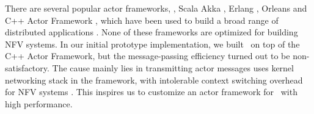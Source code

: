 There are several popular actor frameworks, \eg, Scala Akka \cite{akka}, Erlang \cite{erlang}, Orleans \cite{Orleans} and C++ Actor Framework \cite{caf}, which have been used to build a broad range of distributed applications \cite{akka}. %
 None of these frameworks are optimized for building NFV systems. In our initial prototype implementation, we built \nfactor~on top of the C++ Actor Framework, but the message-passing efficiency turned out to be non-satisfactory. The cause mainly lies in transmitting actor messages uses kernel networking stack in the framework, with intolerable context switching overhead for NFV systems \cite{martins2014clickos}. This inspires us to customize an actor framework for \nfactor~with high performance.

